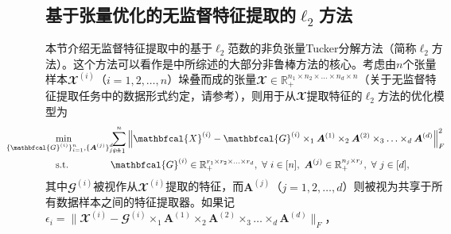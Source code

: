 \subsection{基于张量优化的无监督特征提取的$\ell_{2}$方法}\label{sec:l2}
本节介绍无监督特征提取中的基于$\ell_{2}$范数的非负张量Tucker分解方法（简称$\ell_{2}$方法）。这个方法可以看作是中所综述的大部分非鲁棒方法的核心。考虑由$n$个张量样本$\mathbfcal{X}^{(i)}$（$i=1,2,\ldots,n$）垛叠而成的张量$\mathbfcal{X} \in \mathbb{R}_{+}^{n_1 \times n_2 \times \ldots \times n_d \times n}$（关于无监督特征提取任务中的数据形式约定，请参考），则用于从$\mathbfcal{X}$提取特征的$\ell_{2}$方法的优化模型为
\begin{equation}\label{eq:L2}
\hspace{1em}
    \begin{aligned}
    &\underset{\mathclap{\{\mathbfcal{G}^{(i)}\}_{i=1}^{n}, \{\boldsymbol{A}^{(j)}\}_{j=1}^{d}}}{\min} \qquad\quad &&\sum_{i=1}^{n}\left\|\mathbfcal{X}^{(i)}-\mathbfcal{G}^{(i)} \times_{1} \boldsymbol{A}^{(1)} \times_{2} \boldsymbol{A}^{(2)} \times_{3} \ldots \times_{d} \boldsymbol{A}^{(d)}\right\|_{F}^{2} \\
    &\text{s.t.} && \mathbfcal{G}^{(i)}\in\mathbb{R}_{+}^{r_1 \times r_2 \times \ldots \times r_d},~\forall~i\in[n] ,~\boldsymbol{A}^{(j)}\in \mathbb{R}_{+}^{n_j \times r_j},~\forall~j\in[d],
    \end{aligned}
\end{equation}
其中$\mathbfcal{G}^{(i)}$被视作从$\mathbfcal{X}^{(i)}$提取的特征，而$\boldsymbol{A}^{(j)}$（$j=1,2,\ldots, d$）则被视为共享于所有数据样本之间的特征提取器。如果记$\epsilon_{i}=\|\mathbfcal{X}^{(i)}-\mathbfcal{G}^{(i)} \times_{1} \boldsymbol{A}^{(1)} \times_{2} \boldsymbol{A}^{(2)} \times_{3} \ldots \times_{d} \boldsymbol{A}^{(d)}\|_{F}$，
